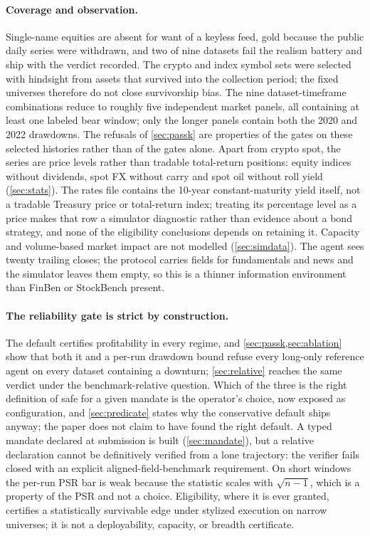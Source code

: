 \paragraph{Coverage and observation.} Single-name equities are absent for want of a keyless feed, gold because the public daily series were withdrawn, and two of nine datasets fail the realism battery and ship with the verdict recorded. The crypto and index symbol sets were selected with hindsight from assets that survived into the collection period; the fixed universes therefore do not close survivorship bias. The nine dataset-timeframe combinations reduce to roughly five independent market panels, all containing at least one labeled bear window; only the longer panels contain both the 2020 and 2022 drawdowns. The refusals of \cref{sec:passk} are properties of the gates on these selected histories rather than of the gates alone. Apart from crypto spot, the series are price levels rather than tradable total-return positions: equity indices without dividends, spot FX without carry and spot oil without roll yield (\cref{sec:stats}). The rates file contains the 10-year constant-maturity yield itself, not a tradable Treasury price or total-return index; treating its percentage level as a price makes that row a simulator diagnostic rather than evidence about a bond strategy, and none of the eligibility conclusions depends on retaining it. Capacity and volume-based market impact are not modelled (\cref{sec:simdata}). The agent sees twenty trailing closes; the protocol carries fields for fundamentals and news and the simulator leaves them empty, so this is a thinner information environment than FinBen or StockBench present.

\paragraph{The reliability gate is strict by construction.} The default certifies profitability in every regime, and \cref{sec:passk,sec:ablation} show that both it and a per-run drawdown bound refuse every long-only reference agent on every dataset containing a downturn; \cref{sec:relative} reaches the same verdict under the benchmark-relative question. Which of the three is the right definition of safe for a given mandate is the operator's choice, now exposed as configuration, and \cref{sec:predicate} states why the conservative default ships anyway; the paper does not claim to have found the right default. A typed mandate declared at submission is built (\cref{sec:mandate}), but a relative declaration cannot be definitively verified from a lone trajectory: the verifier fails closed with an explicit aligned-field-benchmark requirement. On short windows the per-run PSR bar is weak because the statistic scales with $\sqrt{n-1}$, which is a property of the PSR and not a choice. Eligibility, where it is ever granted, certifies a statistically survivable edge under stylized execution on narrow universes; it is not a deployability, capacity, or breadth certificate.


